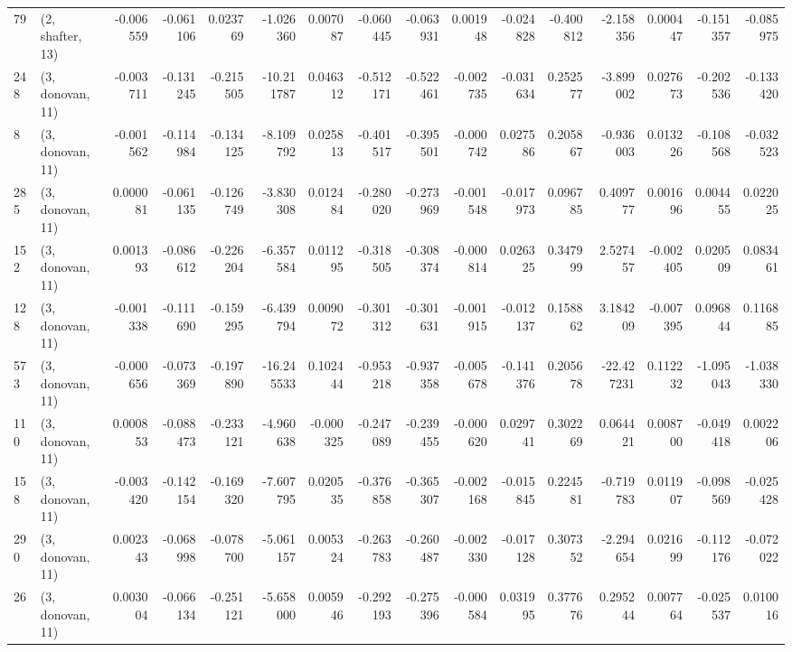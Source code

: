 \begin{tabular}{llrrrrrrrrrrrrrr}
79  &  (2, shafter, 13) &  -0.006559 & -0.061106 &  0.023769 &   -1.026360 &  0.007087 &  -0.060445 &  -0.063931 &  0.001948 & -0.024828 & -0.400812 &   -2.158356 &  0.000447 &  -0.151357 &  -0.085975 \\
248 &  (3, donovan, 11) &  -0.003711 & -0.131245 & -0.215505 &  -10.211787 &  0.046312 &  -0.512171 &  -0.522461 & -0.002735 & -0.031634 &  0.252577 &   -3.899002 &  0.027673 &  -0.202536 &  -0.133420 \\
8   &  (3, donovan, 11) &  -0.001562 & -0.114984 & -0.134125 &   -8.109792 &  0.025813 &  -0.401517 &  -0.395501 & -0.000742 &  0.027586 &  0.205867 &   -0.936003 &  0.013226 &  -0.108568 &  -0.032523 \\
285 &  (3, donovan, 11) &   0.000081 & -0.061135 & -0.126749 &   -3.830308 &  0.012484 &  -0.280020 &  -0.273969 & -0.001548 & -0.017973 &  0.096785 &    0.409777 &  0.001696 &   0.004455 &   0.022025 \\
152 &  (3, donovan, 11) &   0.001393 & -0.086612 & -0.226204 &   -6.357584 &  0.011295 &  -0.318505 &  -0.308374 & -0.000814 &  0.026325 &  0.347999 &    2.527457 & -0.002405 &   0.020509 &   0.083461 \\
128 &  (3, donovan, 11) &  -0.001338 & -0.111690 & -0.159295 &   -6.439794 &  0.009072 &  -0.301312 &  -0.301631 & -0.001915 & -0.012137 &  0.158862 &    3.184209 & -0.007395 &   0.096844 &   0.116885 \\
573 &  (3, donovan, 11) &  -0.000656 & -0.073369 & -0.197890 &  -16.245533 &  0.102444 &  -0.953218 &  -0.937358 & -0.005678 & -0.141376 &  0.205678 &  -22.427231 &  0.112232 &  -1.095043 &  -1.038330 \\
110 &  (3, donovan, 11) &   0.000853 & -0.088473 & -0.233121 &   -4.960638 & -0.000325 &  -0.247089 &  -0.239455 & -0.000620 &  0.029741 &  0.302269 &    0.064421 &  0.008700 &  -0.049418 &   0.002206 \\
158 &  (3, donovan, 11) &  -0.003420 & -0.142154 & -0.169320 &   -7.607795 &  0.020535 &  -0.376858 &  -0.365307 & -0.002168 & -0.015845 &  0.224581 &   -0.719783 &  0.011907 &  -0.098569 &  -0.025428 \\
290 &  (3, donovan, 11) &   0.002343 & -0.068998 & -0.078700 &   -5.061157 &  0.005324 &  -0.263783 &  -0.260487 & -0.002330 & -0.017128 &  0.307352 &   -2.294654 &  0.021699 &  -0.112176 &  -0.072022 \\
26  &  (3, donovan, 11) &   0.003004 & -0.066134 & -0.251121 &   -5.658000 &  0.005946 &  -0.292193 &  -0.275396 & -0.000584 &  0.031995 &  0.377676 &    0.295244 &  0.007764 &  -0.025537 &   0.010016 \\

\end{tabular}

